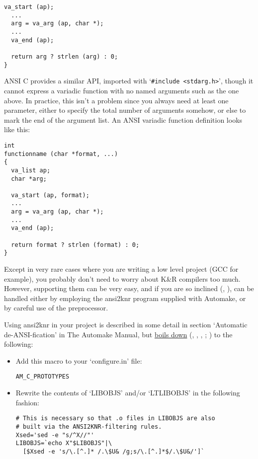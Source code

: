 \begin{enumerate}
\begin{Verbatim}[frame=single]
  va_start (ap);
  ...
  arg = va_arg (ap, char *);
  ...
  va_end (ap);

  return arg ? strlen (arg) : 0;
}
\end{Verbatim}

ANSI C provides a similar API, imported with `\verb+#include <stdarg.h>+',
though it cannot express a variadic function with no named arguments such 
as the one above. In practice, this isn't a problem since you always 
need at least one parameter, either to specify the total number of 
arguments somehow, or else to mark the end of the argument list. An 
ANSI variadic function definition looks like this: 

\begin{Verbatim}[frame=single]
int
functionname (char *format, ...)
{
  va_list ap;
  char *arg;

  va_start (ap, format);
  ...
  arg = va_arg (ap, char *);
  ...
  va_end (ap);

  return format ? strlen (format) : 0;
}

\end{Verbatim}

\end{enumerate}

Except in very rare cases where you are writing a low level project
(GCC for example), you probably don't need to worry about K\&R compilers 
too much. However, supporting them can be very easy, and if you are 
so inclined ({\MdQ{}}, {\MdQ{}}), can be handled either by employing the ansi2knr 
program supplied with Automake, or by careful use of the preprocessor. 


Using ansi2knr in your project is described in some detail in 
section `Automatic de-ANSI-fication' in The Automake Manual,
but \underline{boils down} ({\MmQ{}}, {\MmQ{}}, {\MeQ{}}, {\McQ{}}; {\MbQ{}}) to the following: 

\begin{itemize}
\item Add this macro to your `configure.in' file: 

\begin{Verbatim}[frame=single]
AM_C_PROTOTYPES
\end{Verbatim}

\item Rewrite the contents of `LIBOBJS' and/or `LTLIBOBJS' in the 
following fashion: 


\begin{Verbatim}[frame=single]
# This is necessary so that .o files in LIBOBJS are also
# built via the ANSI2KNR-filtering rules.
Xsed='sed -e "s/^X//"'
LIBOBJS=`echo X"$LIBOBJS"|\
  [$Xsed -e 's/\.[^.]* /.\$U& /g;s/\.[^.]*$/.\$U&/']`
\end{Verbatim}

\end{itemize}

